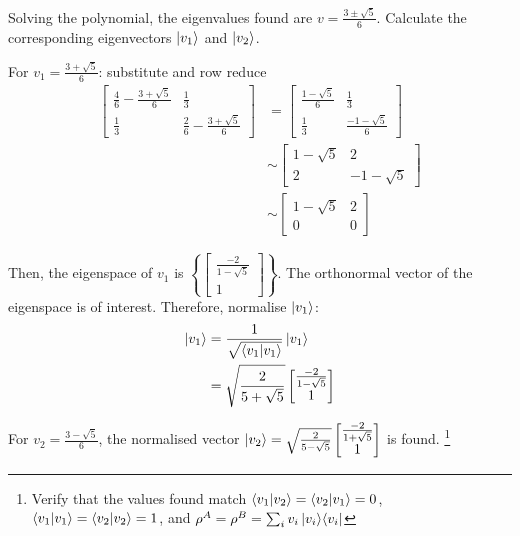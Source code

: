 \begin{enumerate}
        Solving the polynomial, the eigenvalues found are $v = \frac{3 \pm \sqrt5}{6}$.
        Calculate the corresponding eigenvectors $\ket{v_1}$ and $\ket{v_2}$.
        
        For $v_1 = \frac{3 + \sqrt5}{6}$: substitute and row reduce
        \begin{align}
            \left[ \begin{matrix}
            \frac{4}{6} - \frac{3 + \sqrt5}{6} & \frac{1}{3} \\
            \frac{1}{3} & \frac{2}{6} - \frac{3 + \sqrt5}{6}
            \end{matrix} \right]
            &=
            \left[ \begin{matrix}
            \frac{1 - \sqrt5}{6} & \frac{1}{3} \\
            \frac{1}{3} & \frac{-1 - \sqrt5}{6}
            \end{matrix} \right] \\[5pt]
            &\sim \left[ \begin{matrix}
                1 - \sqrt5 & 2 \\ 2 & -1 -\sqrt5 \end{matrix} \right] \\[5pt]
            &\sim \left[ \begin{matrix}
                1 - \sqrt5 & 2 \\ 0 & 0 \end{matrix} \right]
        \end{align}
        
        Then, the eigenspace of $v_1$ is
        $\left\{ \left[ \begin{matrix} \frac{-2}{1 - \sqrt5} \\
        1 \end{matrix} \right] \right\}$.
        The orthonormal vector of the eigenspace is of interest.
        Therefore, normalise $\ket{v_1}$:
        \begin{align}
            \ket{v_1} &= \frac{1}{\sqrt{\mathop{\mathinner{ \langle{v_1}|{v_1}\rangle}}}} \ket{v_1} \\
            &= \sqrt{\frac{2}{5 + \sqrt5}} \left[ \begin{matrix}
                \frac{-2}{1 - \sqrt5} \\ 1 \end{matrix} \right]
        \end{align}
        
        For $v_2 = \frac{3 - \sqrt5}{6}$, the normalised vector
        $\ket{v_2} = \sqrt{\frac{2}{5 - \sqrt5}} \left[ \begin{matrix}
                \frac{-2}{1 + \sqrt5} \\ 1 \end{matrix} \right]$
        is found.
        \footnote{Verify that the values found match
            $\mathop{\mathinner{ \langle{v_1}|{v_2}\rangle}} = \mathop{\mathinner{ \langle{v_2}|{v_1}\rangle}} = 0$,
            $\mathop{\mathinner{ \langle{v_1}|{v_1}\rangle}} = \mathop{\mathinner{ \langle{v_2}|{v_2}\rangle}} = 1$,
            and $\rho^A = \rho^B = \sum_i v_i \mathop{\mathinner{ |{v_i}\rangle \langle{v_i}|}}$}


\end{enumerate}
